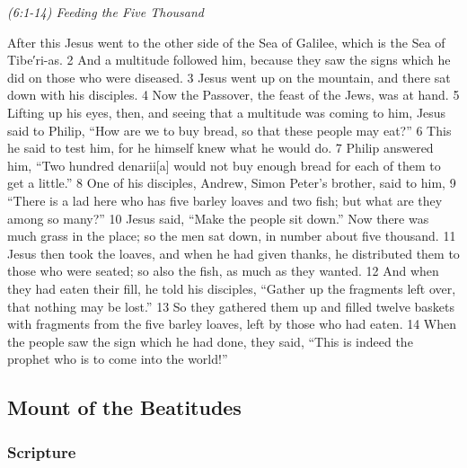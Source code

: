 \documentclass[letterpaper]{report}
\begin{document}
{\centering
	\emph{(6:1-14) Feeding the Five Thousand}\\
}
\begin{multicols}{2}
After this Jesus went to the other side of the Sea of Galilee, which is the Sea of Tibe′ri-as. 2 And a multitude followed him, because they saw the signs which he did on those who were diseased. 3 Jesus went up on the mountain, and there sat down with his disciples. 4 Now the Passover, the feast of the Jews, was at hand. 5 Lifting up his eyes, then, and seeing that a multitude was coming to him, Jesus said to Philip, “How are we to buy bread, so that these people may eat?” 6 This he said to test him, for he himself knew what he would do. 7 Philip answered him, “Two hundred denarii[a] would not buy enough bread for each of them to get a little.” 8 One of his disciples, Andrew, Simon Peter’s brother, said to him, 9 “There is a lad here who has five barley loaves and two fish; but what are they among so many?” 10 Jesus said, “Make the people sit down.” Now there was much grass in the place; so the men sat down, in number about five thousand. 11 Jesus then took the loaves, and when he had given thanks, he distributed them to those who were seated; so also the fish, as much as they wanted. 12 And when they had eaten their fill, he told his disciples, “Gather up the fragments left over, that nothing may be lost.” 13 So they gathered them up and filled twelve baskets with fragments from the five barley loaves, left by those who had eaten. 14 When the people saw the sign which he had done, they said, “This is indeed the prophet who is to come into the world!”
\end{multicols}

\clearpage
\subsection{Mount of the Beatitudes}
\begin{multicols}{2}
	\mbox{}
\end{multicols}
\subsubsection{Scripture}
\end{document}
